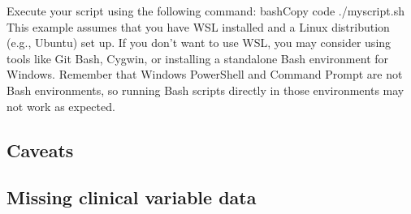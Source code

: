 \documentclass{article}%
\begin{document}
\newline%
%
Execute your script using the following command:%
\newline%
\newline%
%
bashCopy code%
\newline%
\newline%
%
./myscript.sh %
\newline%
\newline%
%
This example assumes that you have WSL installed and a Linux distribution (e.g., Ubuntu) set up. If you don't want to use WSL, you may consider using tools like Git Bash, Cygwin, or installing a standalone Bash environment for Windows.%
\newline%
\newline%
%
Remember that Windows PowerShell and Command Prompt are not Bash environments, so running Bash scripts directly in those environments may not work as expected.%
\newline%
\newline%
%
%
\newline%
\newline%
%
\subsection{Caveats }%
\label{subsec:Caveats}%

%
\subsection{Missing clinical variable data}%
\label{subsec:Missingclinicalvariabledata}%
\end{document}
